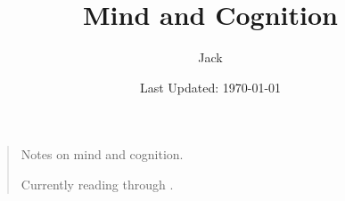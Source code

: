 \documentclass[letterpaper, fontsize=11pt, nodate]{sizzle}
\title{Mind and Cognition}
\author{Jack}
\date{Last Updated: \today}
\numberwithin{equation}{section}
\begin{document}
\maketitle
\begin{quote}
    Notes on mind and cognition.

    Currently reading through \cite{pomac}. 
\end{quote}

\tableofcontents

\newpage





\end{document}
